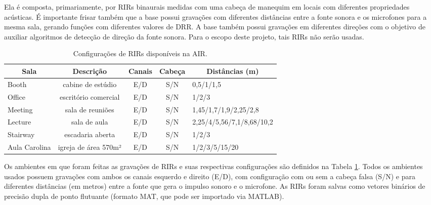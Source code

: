 Ela é composta, primariamente, por RIRs binaurais medidas com uma cabeça de manequim em locais com diferentes
propriedades acústicas. É importante frisar também que a base possui gravações com diferentes distâncias entre a fonte sonora
e os microfones para a mesma sala, gerando funções com diferentes valores de DRR.
A base também possui gravações em diferentes direções com o objetivo de auxiliar algoritmos de detecção
de direção da fonte sonora. Para o escopo deste projeto, tais RIRs não serão usadas. 

\begin{table} [H]
    \centering
    \caption{Configurações de RIRs disponíveis na AIR.}
    \label{tbl:rir}
    \begin{tabularx}{\textwidth}{l|c|c|c|l}
        
        \multicolumn{1}{c|}{\textbf{Sala}} & \multicolumn{1}{c|}{\textbf{Descrição}} & \multicolumn{1}{c|}{\textbf{Canais}} &
        \multicolumn{1}{|c|}{\textbf{Cabeça}} & \multicolumn{1}{c}{\textbf{Distâncias (m)}} \\
        \hline 

        Booth & cabine de estúdio & E/D & S/N & 0,5/1/1,5 \\
        Office & escritório comercial & E/D & S/N & 1/2/3 \\
        Meeting & sala de reuniões & E/D & S/N & 1,45/1,7/1,9/2,25/2,8 \\
        Lecture & sala de aula & E/D & S/N & 2,25/4/5,56/7,1/8,68/10,2 \\
        Stairway & escadaria aberta & E/D & S/N & 1/2/3 \\
        Aula Carolina & igreja de área 570m² & E/D & S/N & 1/2/3/5/15/20 

    \end{tabularx}
\end{table}

Os ambientes em que foram feitas as gravações de RIRs e suas respectivas configurações são definidos na Tabela \ref{tbl:rir}.
Todos os ambientes usados possuem gravações com ambos os canais esquerdo e direito (E/D), com configuração com ou sem a cabeça
falsa (S/N) e para diferentes distâncias (em metros) entre a fonte que gera o impulso sonoro e o microfone.
As RIRs foram salvas como vetores binários de precisão dupla de ponto flutuante (formato MAT, que pode ser importado
via MATLAB\textregistered).

